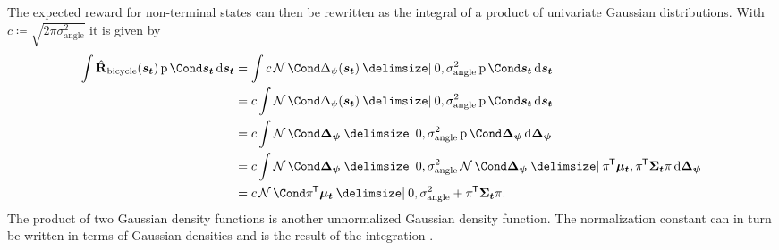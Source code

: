 The expected reward for non-terminal states can then be rewritten as the integral of a product of univariate Gaussian distributions.
With $c \coloneqq \sqrt{2\pi\sigma_{\text{angle}}^2}$ it is given by
\begin{align}
    \int \RwdBicycleHat(\rv{s_t}) \Prob{\rv{s_t}} \diff \rv{s_t} &=  \int c \Gaussian{\Delta_\psi(\rv{s_t}) \given 0, \sigma_{\text{angle}}^2} \Prob{\rv{s_t}} \diff \rv{s_t} \\
    &= c \int \Gaussian{\Delta_\psi(\rv{s_t}) \given 0, \sigma_{\text{angle}}^2} \Prob{\rv{s_t}} \diff \rv{s_t} \\
    &= c \int \Gaussian{\rv{\Delta_\psi} \given 0, \sigma_{\text{angle}}^2} \Prob{\rv{\Delta_\psi}} \diff \rv{\Delta_\psi} \\
    &= c \int \Gaussian{\rv{\Delta_\psi} \given 0, \sigma_{\text{angle}}^2} \Gaussian{\rv{\Delta_\psi} \given \pi\tran \mat{\mu_t}, \pi\tran \mat{\Sigma_t} \pi} \diff \rv{\Delta_\psi} \\
    &= c \Gaussian{\pi\tran \mat{\mu_t} \given 0, \sigma_{\text{angle}}^2 + \pi\tran \mat{\Sigma_t} \pi}.
\end{align}
The product of two Gaussian density functions is another unnormalized Gaussian density function.
The normalization constant can in turn be written in terms of Gaussian densities and is the result of the integration \cite{petersen_matrix_2008}.

